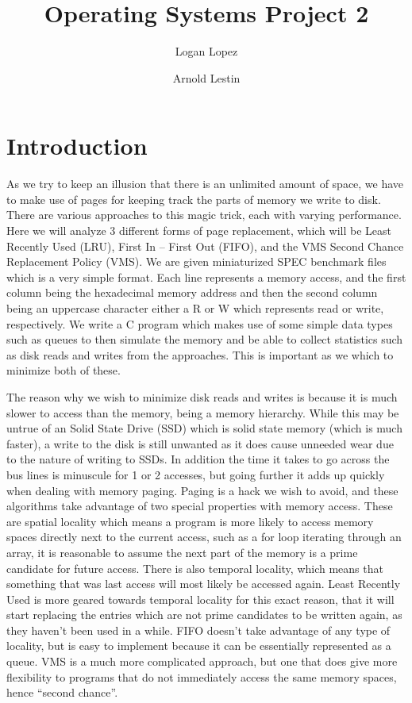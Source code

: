 \documentclass[12pt,letterpaper]{article}
\author{Logan Lopez \and Arnold Lestin}
\title{Operating Systems Project 2}
\begin{document}
	\maketitle
	\section{Introduction}
	As we try to keep an illusion that there is an unlimited amount of space, we have to make use of pages for keeping track the parts of memory we write to disk. There are various approaches to this magic trick, each with varying performance. Here we will analyze 3 different forms of page replacement, which will be Least Recently Used (LRU), First In – First Out (FIFO), and the VMS Second Chance Replacement Policy (VMS). We are given miniaturized SPEC benchmark files which is a very simple format. Each line represents a memory access, and the first column being the hexadecimal memory address and then the second column being an uppercase character either a R or W which represents read or write, respectively. We write a C program which makes use of some simple data types such as queues to then simulate the memory and be able to collect statistics such as disk reads and writes from the approaches. This is important as we which to minimize both of these.
	
	The reason why we wish to minimize disk reads and writes is because it is much slower to access than the memory, being a memory hierarchy. While this may be untrue of an Solid State Drive (SSD) which is solid state memory (which is much faster), a write to the disk is still unwanted as it does cause unneeded wear due to the nature of writing to SSDs. In addition the time it takes to go across the bus lines is minuscule for 1 or 2 accesses, but going further it adds up quickly when dealing with memory paging. Paging is a hack we wish to avoid, and these algorithms take advantage of two special properties with memory access. These are spatial locality which means a program is more likely to access memory spaces directly next to the current access, such as a for loop iterating through an array, it is reasonable to assume the next part of the memory is a prime candidate for future access. There is also temporal locality, which means that something that was last access will most likely be accessed again. Least Recently Used is more geared towards temporal locality for this exact reason, that it will start replacing the entries which are not prime candidates to be written again, as they haven't been used in a while. FIFO doesn't take advantage of any type of locality, but is easy to implement because it can be essentially represented as a queue. VMS is a much more complicated approach, but one that does give more flexibility to programs that do not immediately access the same memory spaces, hence ``second chance''.
	
\end{document}
